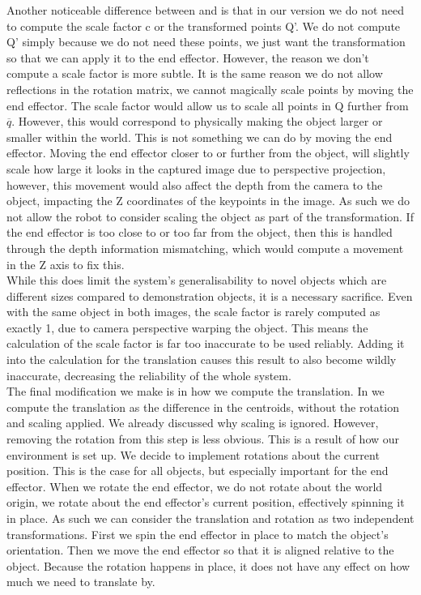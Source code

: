 Another noticeable difference between  and  is that in our version we do not need to compute the scale factor c or the transformed points Q'. We do not compute Q' simply because we do not need these points, we just want the transformation so that we can apply it to the end effector. However, the reason we don't compute a scale factor is more subtle. It is the same reason we do not allow reflections in the rotation matrix, we cannot magically scale points by moving the end effector. The scale factor would allow us to scale all points in Q further from $\overline{q}$. However, this would correspond to physically making the object larger or smaller within the world. This is not something we can do by moving the end effector. Moving the end effector closer to or further from the object, will slightly scale how large it looks in the captured image due to perspective projection, however, this movement would also affect the depth from the camera to the object, impacting the Z coordinates of the keypoints in the image. As such we do not allow the robot to consider scaling the object as part of the transformation. If the end effector is too close to or too far from the object, then this is handled through the depth information mismatching, which would compute a movement in the Z axis to fix this.\\

While this does limit the system's generalisability to novel objects which are different sizes compared to demonstration objects, it is a necessary sacrifice. Even with the same object in both images, the scale factor is rarely computed as exactly 1, due to camera perspective warping the object. This means the calculation of the scale factor is far too inaccurate to be used reliably. Adding it into the calculation for the translation causes this result to also become wildly inaccurate, decreasing the reliability of the whole system.
\\

The final modification we make is in how we compute the translation. In  we compute the translation as the difference in the centroids, without the rotation and scaling applied. We already discussed why scaling is ignored. However, removing the rotation from this step is less obvious. This is a result of how our environment is set up. We decide to implement rotations about the current position. This is the case for all objects, but especially important for the end effector. When we rotate the end effector, we do not rotate about the world origin, we rotate about the end effector's current position, effectively spinning it in place. As such we can consider the translation and rotation as two independent transformations. First we spin the end effector in place to match the object's orientation. Then we move the end effector so that it is aligned relative to the object. Because the rotation happens in place, it does not have any effect on how much we need to translate by.

